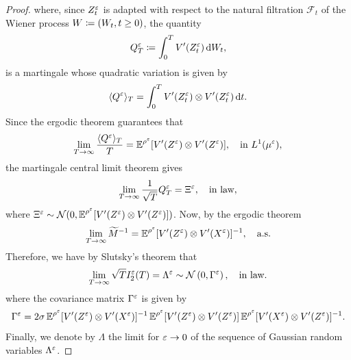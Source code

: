 \documentclass[10pt]{article}
\begin{document}
\begin{proof}
	where, since $Z_t^\varepsilon$ is adapted with respect to the natural filtration $\mathcal F_t$ of the Wiener process $W \coloneqq \left(W_t, t \geq 0\right)$, the quantity
	\begin{equation}
	Q^\varepsilon_T \coloneqq \int_0^T V'(Z^\varepsilon_t) \,\mathrm{d} W_t,
	\end{equation}
	is a martingale whose quadratic variation is given by
	\begin{equation}
	\langle Q^\varepsilon \rangle_T = \int_0^T V'(Z^\varepsilon_t) \otimes V'(Z^\varepsilon_t) \,\mathrm{d} t. 
	\end{equation}
	Since the ergodic theorem guarantees that 
	\begin{equation}
	\lim_{T\to\infty}\frac{\langle Q^\varepsilon \rangle_T}{T} = \operatorname{\mathbb{E}}^{\rho^\varepsilon}[V'(Z^\varepsilon) \otimes V'(Z^\varepsilon)], \quad \text{in } L^1(\mu^\varepsilon),
	\end{equation}
	the martingale central limit theorem gives 
	\begin{equation}
	\lim_{T\to\infty}\frac{1}{\sqrt{T}} Q^\varepsilon_T = \Xi^\varepsilon, \quad \text{in law},
	\end{equation}
	where $\Xi^\varepsilon \sim \mathcal N(0, \operatorname{\mathbb{E}}^{\rho^\varepsilon}[V'(Z^\varepsilon) \otimes V'(Z^\varepsilon)])$.
	Now, by the ergodic theorem 
	\begin{equation}
	\lim_{T \to \infty} \widetilde M^{-1} = \operatorname{\mathbb{E}}^{\rho^\varepsilon}[V'(Z^\varepsilon) \otimes V'(X^\varepsilon)]^{-1}, \quad \text{a.s.}
	\end{equation}
	Therefore, we have by Slutsky's theorem that
	\begin{equation}
	\lim_{T \to \infty} \sqrt{T} I_2^\varepsilon(T) = \Lambda^\varepsilon \sim \mathcal N\left(0, \Gamma^\varepsilon\right), \quad \text{in law}.
	\end{equation}
	where the covariance matrix $\Gamma^\varepsilon$ is given by
	\begin{equation}
		\Gamma^\varepsilon = 2\sigma \operatorname{\mathbb{E}}^{\rho^\varepsilon}[V'(Z^\varepsilon) \otimes V'(X^\varepsilon)]^{-1}\operatorname{\mathbb{E}}^{\rho^\varepsilon}[V'(Z^\varepsilon) \otimes V'(Z^\varepsilon)]\operatorname{\mathbb{E}}^{\rho^\varepsilon}[V'(X^\varepsilon) \otimes V'(Z^\varepsilon)]^{-1}.
	\end{equation}
	Finally, we denote by $\Lambda$ the limit for $\varepsilon \to 0$ of the sequence of Gaussian random variables $\Lambda^\varepsilon$.
	

\end{proof}
\end{document}

